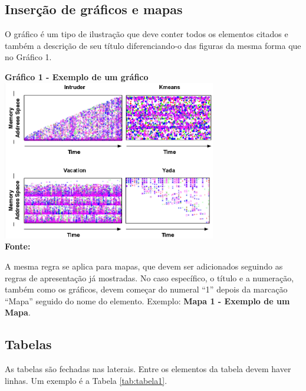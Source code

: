 \subsection{\esp Inserção de gráficos e mapas}

O gráfico é um tipo de ilustração que deve conter todos os elementos citados e também a descrição de seu título
diferenciando-o das figuras da mesma forma que no Gráfico 1. 

\begin{center}
	\centering	
 	\textbf{Gráfico 1 - Exemplo de um gráfico} \\
	\includegraphics[width=0.7\textwidth]{figuras/access.png}
	 \vspace{-0.3cm}
	\\\textbf{\footnotesize Fonte: \cite{tese}}
	\label{grafico1}
\end{center}

A mesma regra se aplica para mapas, que devem ser adicionados seguindo as regras de apresentação já mostradas. No caso específico,
o título e a numeração, também como os gráficos, devem começar do numeral ``1'' depois da marcação ``Mapa'' seguido do nome do elemento.
Exemplo: \textbf{Mapa 1 - Exemplo de um Mapa}.

 \subsection{\esp Tabelas}

As tabelas são fechadas nas laterais. Entre os elementos da tabela devem haver linhas. Um exemplo é a Tabela \ref{tab:tabela1}. 

